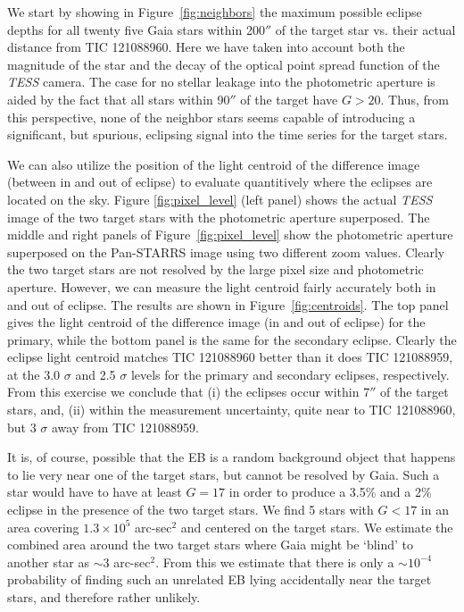 \documentclass[fleqn,usenatbib]{mnras} %
\begin{document}
We start by showing in Figure~\ref{fig:neighbors} the maximum possible eclipse depths for all twenty five Gaia stars within 200$''$ of the target star vs. their actual distance from TIC 121088960.  Here we have taken into account both the magnitude of the star and the decay of the optical point spread function of the {\em TESS} camera.  The case for no stellar leakage into the photometric aperture is aided by the fact that all stars within 90$''$ of the target have $G > 20$.  Thus, from this perspective, none of the neighbor stars seems capable of introducing a significant, but spurious, eclipsing signal into the time series for the target stars.

We can also utilize the position of the light centroid of the difference image (between in and out of eclipse) to evaluate quantitively where the eclipses are located on the sky.  Figure \ref{fig:pixel_level} (left panel) shows the actual {\em TESS} image of the two target stars with the photometric aperture superposed.  The middle and right panels of Figure~\ref{fig:pixel_level} show the photometric aperture superposed on the Pan-STARRS image using two different zoom values.  Clearly the two target stars are not resolved by the large pixel size and photometric aperture.  However, we can measure the light centroid fairly accurately both in and out of eclipse.  The results are shown in Figure~\ref{fig:centroids}.  The top panel gives the light centroid of the difference image (in and out of eclipse) for the primary, while the bottom panel is the same for the secondary eclipse.  Clearly the eclipse light centroid matches TIC 121088960 better than it does TIC 121088959, at the 3.0 $\sigma$ and 2.5 $\sigma$ levels for the primary and secondary eclipses, respectively. From this exercise we conclude that (i) the eclipses occur within 7$''$ of the target stars, and, (ii) within the measurement uncertainty, quite near to TIC 121088960, but 3 $\sigma$ away from TIC 121088959.

It is, of course, possible that the EB is a random background object that happens to lie very near one of the target stars, but cannot be resolved by Gaia.  Such a star would have to have at least $G = 17$ in order to produce a 3.5\% and a 2\% eclipse in the presence of the two target stars. We find 5 stars with $G < 17$ in an area covering $1.3 \times 10^5$ arc-sec$^2$ and centered on the target stars. We estimate the combined area around the two target stars where Gaia might be `blind' to another star as $\sim$3 arc-sec$^2$. From this we estimate that there is only a $\sim10^{-4}$ probability of finding such an unrelated EB lying accidentally near the target stars,  and therefore rather unlikely.
\end{document}
